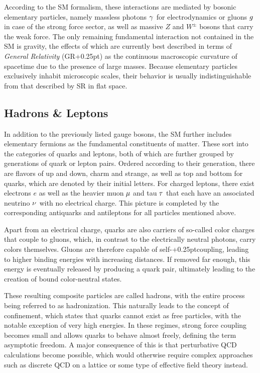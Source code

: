 According to the SM formalism, these interactions are mediated by bosonic elementary particles, namely massless photons
$\gamma \kern+0.75pt$ for electrodynamics or gluons $\kern-0.5pt g$ in case of the strong force sector, as well as massive
$Z$ and $W^\pm$ bosons that carry the weak force. The only remaining fundamental interaction not contained in the SM is gravity,
the effects of which are currently best described in terms of \emph{General Relativity} (GR{\kern+0.25pt}) as the continuous
macroscopic curvature of spacetime due to the presence of large masses. Because elementary particles exclusively inhabit
microscopic scales, their behavior is usually indistinguishable from that described by SR in flat space.



\subsection{Hadrons \& Leptons}
\label{sub:hadrons}

In addition to the previously listed gauge bosons, the SM further includes elementary fermions as the fundamental constituents of
matter. These sort into the categories of quarks and leptons, both of which are further grouped by generations of quark or lepton
pairs. Ordered according to their generation, there are flavors of up and down, charm and strange, as well as top and bottom for
quarks, which are denoted by their initial letters. For charged leptons, there exist electrons $e$ as well as the heavier muon
$\kern-0.5pt \mu$ and tau $\kern-0.5pt \tau \kern+0.5pt$ that each have an associated neutrino $\nu \kern+0.5pt$ with no electrical
charge. This picture is completed by the corresponding antiquarks and antileptons for all particles mentioned above.

Apart from an electrical charge, quarks are also carriers of so-called color charges that couple to gluons, which, in contrast
to the electrically neutral photons, carry colors themselves. Gluons are therefore capable of self-{\kern+0.25pt}coupling,
leading to higher binding energies with increasing distances. If removed far enough, this energy is eventually
released by producing a quark pair, ultimately leading to the creation of bound color-neutral states.

These resulting composite particles are called hadrons, with the entire process being referred to as hadronization. This naturally
leads to the concept of confinement, which states that quarks cannot exist as free particles, with the notable exception of very
high energies. In these regimes, strong force coupling becomes small and allows quarks to behave almost freely, defining the term
asymptotic freedom. A major consequence of this is that perturbative QCD calculations become possible, which would otherwise
require complex approaches such as discrete QCD on a lattice or some type of effective field theory instead.

